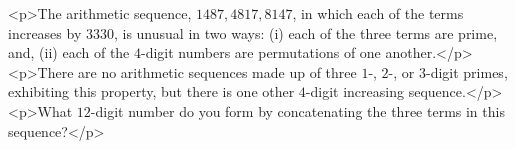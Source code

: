 <p>The arithmetic sequence, $1487, 4817, 8147$, in which each of the terms increases by $3330$, is unusual in two ways: (i) each of the three terms are prime, and, (ii) each of the $4$-digit numbers are permutations of one another.</p>
<p>There are no arithmetic sequences made up of three $1$-, $2$-, or $3$-digit primes, exhibiting this property, but there is one other $4$-digit increasing sequence.</p>
<p>What $12$-digit number do you form by concatenating the three terms in this sequence?</p>
